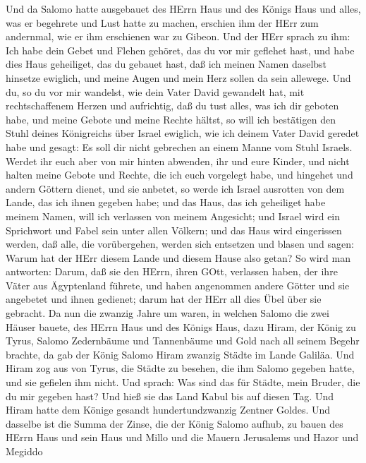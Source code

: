  Und da Salomo hatte ausgebauet des HErrn Haus und des
Königs Haus und alles, was er begehrete und Lust hatte zu machen,
 erschien ihm der HErr zum andernmal, wie er ihm erschienen
war zu Gibeon.  Und der HErr sprach zu ihm: Ich habe dein
Gebet und Flehen gehöret, das du vor mir geflehet hast, und habe dies
Haus geheiliget, das du gebauet hast, daß ich meinen Namen daselbst
hinsetze ewiglich, und meine Augen und mein Herz sollen da sein
allewege.  Und du, so du vor mir wandelst, wie dein Vater
David gewandelt hat, mit rechtschaffenem Herzen und aufrichtig, daß du
tust alles, was ich dir geboten habe, und meine Gebote und meine Rechte
hältst,  so will ich bestätigen den Stuhl deines Königreichs
über Israel ewiglich, wie ich deinem Vater David geredet habe und
gesagt: Es soll dir nicht gebrechen an einem Manne vom Stuhl Israels.
 Werdet ihr euch aber von mir hinten abwenden, ihr und eure
Kinder, und nicht halten meine Gebote und Rechte, die ich euch vorgelegt
habe, und hingehet und andern Göttern dienet, und sie anbetet,
 so werde ich Israel ausrotten von dem Lande, das ich ihnen
gegeben habe; und das Haus, das ich geheiliget habe meinem Namen, will
ich verlassen von meinem Angesicht; und Israel wird ein Sprichwort und
Fabel sein unter allen Völkern;  und das Haus wird
eingerissen werden, daß alle, die vorübergehen, werden sich entsetzen
und blasen und sagen: Warum hat der HErr diesem Lande und diesem Hause
also getan?  So wird man antworten: Darum, daß sie den
HErrn, ihren GOtt, verlassen haben, der ihre Väter aus Ägyptenland
führete, und haben angenommen andere Götter und sie angebetet und ihnen
gedienet; darum hat der HErr all dies Übel über sie gebracht.
 Da nun die zwanzig Jahre um waren, in welchen Salomo die
zwei Häuser bauete, des HErrn Haus und des Königs Haus, 
dazu Hiram, der König zu Tyrus, Salomo Zedernbäume und Tannenbäume und
Gold nach all seinem Begehr brachte, da gab der König Salomo Hiram
zwanzig Städte im Lande Galiläa.  Und Hiram zog aus von
Tyrus, die Städte zu besehen, die ihm Salomo gegeben hatte, und sie
gefielen ihm nicht.  Und sprach: Was sind das für Städte,
mein Bruder, die du mir gegeben hast? Und hieß sie das Land Kabul bis
auf diesen Tag.  Und Hiram hatte dem Könige gesandt
hundertundzwanzig Zentner Goldes.  Und dasselbe ist die
Summa der Zinse, die der König Salomo aufhub, zu bauen des HErrn Haus
und sein Haus und Millo und die Mauern Jerusalems und Hazor und Megiddo
